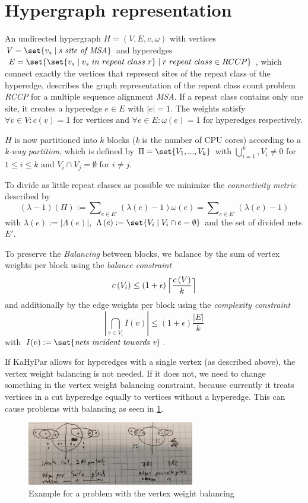 \documentclass{article}
\DeclarePairedDelimiter{\ceil}{\lceil}{\rceil}
\DeclarePairedDelimiter\set\{\}
\begin{document}
	\section{Hypergraph representation}
	An undirected hypergraph $H=\left( V,E,c,\omega \right)$ with vertices $V=\set{ v_s \mid \textit{s site of MSA}}$ and hyperedges $E=\set{
		\set{
			v_s \mid v_s\ in\ repeat\ class\ r
		} \mid r\ repeat\ class \in RCCP
	}$, which connect exactly the vertices that represent sites of the repeat class of the hyperedge, describes the graph representation of the repeat class count problem \textit{RCCP} for a multiple sequence alignment \textit{MSA}. If a repeat class contains only one site, it creates a hyperedge $e \in E$ with $|e|=1$. The weights satisfy  $\forall v \in V: c\left(v\right)=1$ for vertices and $\forall e \in E: \omega\left(e\right)=1$ for hyperedges respectively.
	
	$H$ is now partitioned into $k$ blocks (\textit{k} is the number of CPU cores) according to a \textit{k-way partition}, which is defined by $\Pi = \set{V_1,...,V_k}$ with $\bigcup\nolimits_{i=1}^k, V_i \ne 0$ for $1 \leq i \leq k$ and $V_i \cap V_j = \emptyset$ for $i \neq j$.
	
	To divide as little repeat classes as possible we minimize the \textit{connectivity metric} described by  \[ \left(\lambda-1\right)\left(\Pi\right):=\sum\nolimits_{e \in E'}\left(\lambda\left(e\right)-1\right)\omega\left(e\right) = \sum\nolimits_{e \in E'}\left(\lambda\left(e\right)-1\right) \] with $\lambda\left(e\right):=|\Lambda\left(e\right)|$, $\Lambda\left(e\right):=\set{V_i \mid V_i \cap e = \emptyset}$ and the set of divided nets $E'$. 
	
	To preserve the \textit{Balancing} between blocks, we balance by the sum of vertex weights per block using the \textit{balance constraint} \[ c\left(V_i\right) \le \left(1+\epsilon\right)\ceil[\Big]{\frac{c\left(V\right)}{k}} \] and additionally by the edge weights per block using the \textit{complexity constraint} \[ \left|\bigcap_{v \in V_i}I\left(v\right)\right| \leq \left(1+\epsilon\right)\frac{\left|E\right|}{k} \] with $I(v):=\set{\textit{nets incident towards v}}$.
	
	If KaHyPar allows for hyperedges with a single vertex (as described above), the vertex weight balancing is not needed. If it does not, we need to change something in the vertex weight balancing constraint, because currently it treats vertices in a cut hyperedge equally to vertices without a hyperedge. This can cause problems with balancing as seen in \ref{fig:example}.
	
	\begin{figure}[hb]
		\label{fig:example}
		\centering
		\includegraphics[width=0.65\textwidth]{example.png}
		\caption{Example for a problem with the vertex weight balancing}
	\end{figure}
\end{document}
